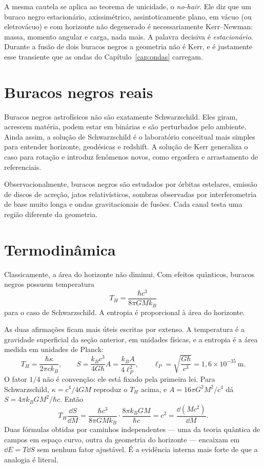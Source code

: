 \documentclass[12pt,a4paper,oneside]{book}
\theoremstyle{rgplain}
\theoremstyle{rgremark}
\begin{document}
A mesma cautela se aplica ao teorema de unicidade, o \emph{no-hair}. Ele diz que
um buraco negro estacionário, axissimétrico, assintoticamente plano, em vácuo
(ou eletrovácuo) e com horizonte não degenerado é necessariamente
Kerr--Newman: massa, momento angular e carga, nada mais. A palavra decisiva é
\emph{estacionário}. Durante a fusão de dois buracos negros a geometria não é
Kerr, e é justamente esse transiente que as ondas do Capítulo~\ref{cap:ondas}
carregam.

\section{Buracos negros reais}

Buracos negros astrofísicos não são exatamente Schwarzschild. Eles giram,
acrescem matéria, podem estar em binárias e são perturbados pelo ambiente.
Ainda assim, a solução de Schwarzschild é o laboratório conceitual mais simples
para entender horizonte, geodésicas e redshift. A solução de Kerr generaliza o
caso para rotação e introduz fenômenos novos, como ergosfera e arrastamento de
referenciais.

Observacionalmente, buracos negros são estudados por órbitas estelares,
emissão de discos de acreção, jatos relativísticos, sombras observadas por
interferometria de base muito longa e ondas gravitacionais de fusões. Cada
canal testa uma região diferente da geometria.

\section{Termodinâmica}

Classicamente, a área do horizonte não diminui. Com efeitos quânticos, buracos
negros possuem temperatura
\[
  T_H=\frac{\hbar c^3}{8\pi G M k_B}
\]
para o caso de Schwarzschild. A entropia é proporcional à área do horizonte.

As duas afirmações ficam mais úteis escritas por extenso. A temperatura é a
gravidade superficial da seção anterior, em unidades físicas, e a entropia é a
área medida em unidades de Planck:
\begin{equation}
  T_H=\frac{\hbar\kappa}{2\pi ck_B},
  \qquad
  S=\frac{k_Bc^3}{4G\hbar}A=\frac{k_BA}{4\ell_P^2},
  \qquad
  \ell_P=\sqrt{\frac{G\hbar}{c^3}}=1{,}6\times10^{-35}\ \text{m}.
  \label{eq:hawking-bekenstein}
\end{equation}
O fator $1/4$ não é convenção: ele está fixado pela primeira lei. Para
Schwarzschild, $\kappa=c^4/4GM$ reproduz o $T_H$ acima, e
$A=16\pi G^2M^2/c^4$ dá $S=4\pi k_BGM^2/\hbar c$. Então
\[
  T_H\frac{\dd S}{\dd M}
  =\frac{\hbar c^3}{8\pi GMk_B}\cdot\frac{8\pi k_BGM}{\hbar c}
  =c^2=\frac{\dd(Mc^2)}{\dd M} .
\]
Duas fórmulas obtidas por caminhos independentes --- uma da teoria quântica de
campos em espaço curvo, outra da geometria do horizonte --- encaixam em
$\dd E=T\dd S$ sem nenhum fator ajustável. É a evidência interna mais forte de
que a analogia é literal.
\end{document}
